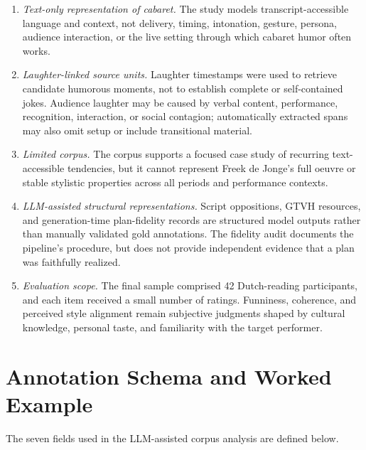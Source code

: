 \documentclass[11pt]{article}
\providecommand{\tightlist}{}
\begin{document}
\begin{enumerate}
\def\labelenumi{\arabic{enumi}.}
\tightlist
\item
  \emph{Text-only representation of cabaret.} The study models transcript-accessible language and context, not delivery, timing, intonation, gesture, persona, audience interaction, or the live setting through which cabaret humor often works.
\item
  \emph{Laughter-linked source units.} Laughter timestamps were used to retrieve candidate humorous moments, not to establish complete or self-contained jokes. Audience laughter may be caused by verbal content, performance, recognition, interaction, or social contagion; automatically extracted spans may also omit setup or include transitional material.
\item
  \emph{Limited corpus.} The corpus supports a focused case study of recurring text-accessible tendencies, but it cannot represent Freek de Jonge's full oeuvre or stable stylistic properties across all periods and performance contexts.
\item
  \emph{LLM-assisted structural representations.} Script oppositions, GTVH resources, and generation-time plan-fidelity records are structured model outputs rather than manually validated gold annotations. The fidelity audit documents the pipeline's procedure, but does not provide independent evidence that a plan was faithfully realized.
\item
  \emph{Evaluation scope.} The final sample comprised 42 Dutch-reading participants, and each item received a small number of ratings. Funniness, coherence, and perceived style alignment remain subjective judgments shaped by cultural knowledge, personal taste, and familiarity with the target performer.
\end{enumerate}

\appendix

\section{Annotation Schema and Worked Example}\label{appendix-a-annotation-schema-and-worked-example}

The seven fields used in the LLM-assisted corpus analysis are defined below.
\end{document}
